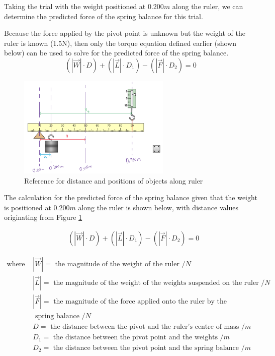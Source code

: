 \documentclass[letterpaper, 12pt]{article}
\begin{document}
Taking the trial with the weight positioned at $0.200\unit{m}$ along the ruler,
we can determine the predicted force of the spring balance for this trial.

Because the force applied by the pivot point is unknown but the weight of the ruler is known (1.5\unit{N}),
then only the torque equation defined earlier (shown below) can be used to solve for
the predicted force of the spring balance.
$$
    \left(\left|\vec{W}\right|\cdot D\right) + \left(\left|\vec{L}\right|\cdot D_1\right) - \left(\left|\vec{F}\right|\cdot D_2\right) = 0
$$

\begin{figure}[H]
    \centering
    \includegraphics[width=0.65\textwidth]{distanceref}
    \caption{Reference for distance and positions of objects along ruler}
    \label{fig:distRef}
\end{figure}

The calculation for the predicted force of the spring balance given that
the weight is positioned at $0.200\unit{m}$ along the ruler is shown below,
with distance values originating from Figure \ref*{fig:distRef}

\begin{align*}
     & \left(\left|\vec{W}\right|\cdot D\right) + \left(\left|\vec{L}\right|\cdot D_1\right) - \left(\left|\vec{F}\right|\cdot D_2\right) = 0
\end{align*}

\begin{align*}
    \text{where } & \left|\vec{W}\right| = \text{ the magnitude of the weight of the ruler } /\unit{N}
    \\
                  & \left|\vec{L}\right| = \text{ the magnitude of the weight of the weights suspended on the ruler } /\unit{N}
    \\
                  & \left|\vec{F}\right| = \text{ the magnitude of the force applied onto the ruler by the}
    \\ &\text{ spring balance } /\unit{N}
    \\
                  & D = \text{ the distance between the pivot and the ruler's centre of mass } /\unit{m}
    \\ & D_1 = \text{ the distance between the pivot point and the weights } /\unit{m}
    \\ & D_2 = \text{ the distance between the pivot point and the spring balance } /\unit{m}
\end{align*}
\end{document}
